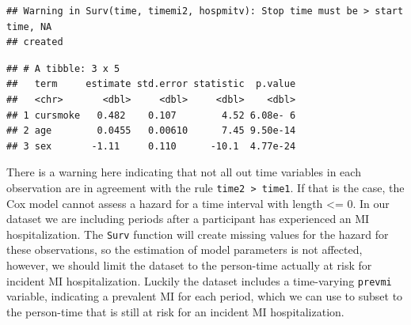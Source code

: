 \documentclass[
]{book}
\newenvironment{Shaded}{\begin{snugshade}}{\end{snugshade}}
\newcommand{\DataTypeTok}[1]{\textcolor[rgb]{0.13,0.29,0.53}{#1}}
\newcommand{\DecValTok}[1]{\textcolor[rgb]{0.00,0.00,0.81}{#1}}
\newcommand{\KeywordTok}[1]{\textcolor[rgb]{0.13,0.29,0.53}{\textbf{#1}}}
\newcommand{\NormalTok}[1]{#1}
\newcommand{\OperatorTok}[1]{\textcolor[rgb]{0.81,0.36,0.00}{\textbf{#1}}}
\newcommand{\StringTok}[1]{\textcolor[rgb]{0.31,0.60,0.02}{#1}}
\begin{document}
\begin{verbatim}
## Warning in Surv(time, timemi2, hospmitv): Stop time must be > start time, NA
## created
\end{verbatim}

\begin{Shaded}
\end{Shaded}

\begin{verbatim}
## # A tibble: 3 x 5
##   term     estimate std.error statistic  p.value
##   <chr>       <dbl>     <dbl>     <dbl>    <dbl>
## 1 cursmoke   0.482    0.107        4.52 6.08e- 6
## 2 age        0.0455   0.00610      7.45 9.50e-14
## 3 sex       -1.11     0.110      -10.1  4.77e-24
\end{verbatim}

There is a warning here indicating that not all out time variables in each observation are in agreement with the rule \texttt{time2\ \textgreater{}\ time1}. If that is the case, the Cox model cannot assess a hazard for a time interval with length \textless= 0. In our dataset we are including periods after a participant has experienced an MI hospitalization. The \texttt{Surv} function will create missing values for the hazard for these observations, so the estimation of model parameters is not affected, however, we should limit the dataset to the person-time actually at risk for incident MI hospitalization. Luckily the dataset includes a time-varying \texttt{prevmi} variable, indicating a prevalent MI for each period, which we can use to subset to the person-time that is still at risk for an incident MI hospitalization.

\begin{Shaded}
\end{Shaded}
\end{document}

